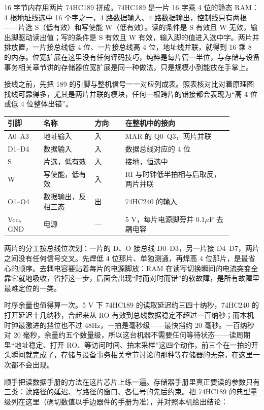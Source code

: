16 字节内存用两片 74HC189 拼成。74HC189 是一片 16 字乘 4 位的静态 RAM：4 根地址线选中 16 个字之一，4 路数据输入、4 路数据输出，控制线只有两根——片选 S（低有效）和写使能 W（低有效）。读的条件是 S 有效且 W 无效，输出脚驱动读出值；写的条件是 S 有效且 W 有效，输入脚的值进入选中字。两片并排放置，一片接总线低 4 位、一片接总线高 4 位，地址线并联，就得到 16 乘 8 的内存。位宽扩展在这里没有任何译码技巧，纯粹是每片管一半位，与存储与设备事务相关章节讲的存储器位宽扩展是同一种做法，只是规模小到能放在手掌上。

接线之前，先把 189 的引脚与整机信号一一对应列成表。照表核对比对着原理图找线可靠得多，尤其是两片并联的模块，任何一根跨片的错接都会表现为“高 4 位或低 4 位整体出错”。

\begin{longtable}{L{0.14\linewidth}L{0.20\linewidth}L{0.12\linewidth}L{0.42\linewidth}}
\toprule
引脚 & 名称 & 方向 & 在整机中的接向 \\
\midrule
A0–A3 & 地址输入 & 入 & MAR 的 Q0–Q3，两片并联 \\\tablerowrule
D1–D4 & 数据输入 & 入 & 数据总线对应的 4 位 \\\tablerowrule
S & 片选，低有效 & 入 & 接地，恒选中 \\\tablerowrule
W & 写使能，低有效 & 入 & RI 与时钟低半拍相与后取反，两片并联 \\\tablerowrule
O1–O4 & 数据输出，反相三态 & 出 & 74HC240 的输入 \\\tablerowrule
Vcc、GND & 电源 & — & 5 V，每片电源脚旁并 0.1$\mu$F 去耦电容 \\
\bottomrule
\end{longtable}

两片的分工按总线位次划：一片的 D、O 接总线 D0–D3，另一片接 D4–D7，两片之间没有任何信号交叉。先焊低 4 位那片、单独测通，再焊高 4 位那片，是最省心的顺序。去耦电容要贴着每片的电源脚放：RAM 在读写切换瞬间的电流突变全靠它就地吸收，省掉这一步，后面会出现“时而对时而错”的软故障，是所有故障里最难定位的一类。

时序余量也值得算一次。5 V 下 74HC189 的读取延迟约三四十纳秒，74HC240 的打开延迟十几纳秒，合起来从 RO 有效到总线数据稳定不超过一百纳秒；而本机时钟最激进的挡位也不过 48Hz，一拍是毫秒级——最快挡约 20 毫秒。一百纳秒对 20 毫秒，余量约五个数量级，所以这台机器不需要任何等待状态——读周期里“地址稳定、打开 RO、等访问时间、拍末采样”这四个动作，前三个在一拍的开头瞬间就完成了，存储与设备事务相关章节讨论的那种等存储器的无奈，在这里一次都不会出现。

顺手把读数据手册的方法在这片芯片上练一遍。存储器手册里真正要读的参数只有三类：读路径的延迟、写路径的窗口、各信号的先后约束。把 74HC189 的典型量级列在这里（确切数值以手边器件的手册为准），并对照本机给出结论：

